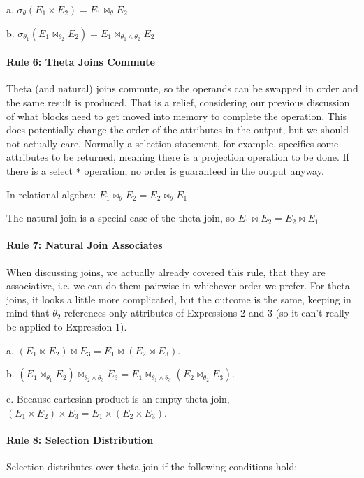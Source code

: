 a. $\sigma_{\theta}(E_{1} \times E_{2}) = E_{1} \bowtie_{\theta} E_{2}$

b. $\sigma_{\theta_{1}}( E_{1} \bowtie_{\theta_{2}} E_{2}) = E_{1} \bowtie_{\theta_{1}\wedge\theta_{2}} E_{2}$

\paragraph{Rule 6: Theta Joins Commute}
Theta (and natural) joins commute, so the operands can be swapped in order and the same result is produced. That is a relief, considering our previous discussion of what blocks need to get moved into memory to complete the operation. This does potentially change the order of the attributes in the output, but we should not actually care. Normally a selection statement, for example, specifies some attributes to be returned, meaning there is a projection operation to be done. If there is a select \texttt{*} operation, no order is guaranteed in the output anyway.

In relational algebra: $E_{1} \bowtie_{\theta} E_{2} = E_{2} \bowtie_{\theta} E_{1}$

The natural join is a special case of the theta join, so $E_{1} \bowtie E_{2} = E_{2} \bowtie E_{1}$

\paragraph{Rule 7: Natural Join Associates}
When discussing joins, we actually already covered this rule, that they are associative, i.e. we can do them pairwise in whichever order we prefer. For theta joins, it looks a little more complicated, but the outcome is the same, keeping in mind that $\theta_{2}$ references only attributes of Expressions 2 and 3 (so it can't really be applied to Expression 1).


a. $(E_{1} \bowtie E_{2}) \bowtie E_{3} = E_{1} \bowtie (E_{2} \bowtie E_{3})$. 

b. $(E_{1} \bowtie_{\theta_{1}} E_{2}) \bowtie_{\theta_{2}\wedge\theta_{3}} E_{3} = E_{1} \bowtie_{\theta_{1}\wedge\theta_{3}} (E_{2} \bowtie_{\theta_{2}} E_{3})$. 

c. Because cartesian product is an empty theta join, $(E_{1} \times E_{2}) \times E_{3} = E_{1} \times (E_{2} \times E_{3})$. 


\paragraph{Rule 8: Selection Distribution}
Selection distributes over theta join if the following conditions hold:

